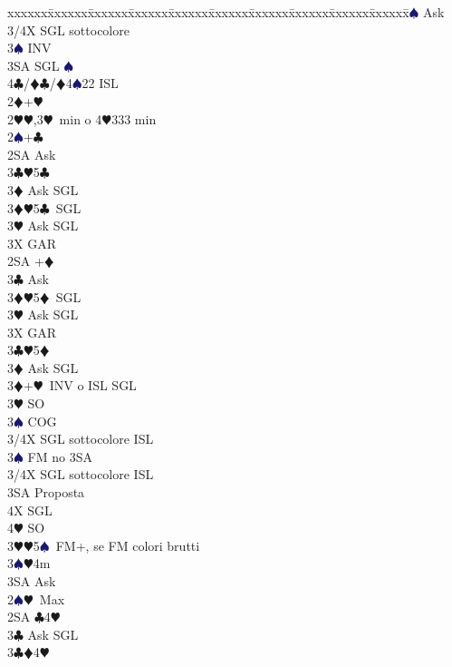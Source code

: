 \documentclass[a4paper,italian]{article}
\newcommand{\BC}{\textcolor{OliveGreen}{$\clubsuit$}}
\newcommand{\BD}{\textcolor{RedOrange}{$\vardiamondsuit$}}
\newcommand{\BH}{\textcolor{Red2}{$\varheartsuit${}}}
\newcommand{\BS}{\textcolor{MidnightBlue}{$\spadesuit${}}}
\newenvironment{bidtable}
{\begin{tabbing}

    xxxxxx\=xxxxxx\=xxxxxx\=xxxxxx\=xxxxxx\=xxxxxx\=xxxxxx\=xxxxxx\=xxxxxx\=xxxxxx\=\kill}
{\end{tabbing} }%
\begin{document}
\begin{multicols}{2}
\begin{bidtable}
        3\BS \> Ask\+\\
        3/4X \> SGL sottocolore\-\-\\
        3\BS \> INV\\
        3SA \> SGL \BS \\
        4\BC/\BD {}\BC /\BD 4\BS 22 ISL\-\-\\
        2\BD {}+\BH \+\\
        2\BH {}\BH ,3\BH\ min o 4\BH 333 min\+\\
        2\BS {}+\BC \+\\
        2SA \> Ask\+\\
        3\BC {}\BH 5\BC \+\\
        3\BD \> Ask SGL\-\\
        3\BD {}\BH 5\BC\ SGL\+\\
        3\BH \> Ask SGL\-\\
        3X \> GAR\-\-\\
        2SA +\BD \+\\
        3\BC \> Ask\+\\
        3\BD {}\BH 5\BD\ SGL\+\\
        3\BH \> Ask SGL\-\\
        3X \> GAR\-\-\\
        3\BC {}\BH 5\BD \+\\
        3\BD \> Ask SGL\-\\
        3\BD {}+\BH\ INV o ISL SGL\+\\
        3\BH \> SO\+\\
        3\BS \> COG\\
        3/4X \> SGL sottocolore ISL\-\\
        3\BS \> FM no 3SA\+\\
        3/4X \> SGL sottocolore ISL\-\\
        3SA \> Proposta\+\\
        4X \> SGL\\
        4\BH \> SO\-\-\\
        3\BH {}\BH 5\BS\ FM+, se FM colori brutti\\
        3\BS {}\BH 4m\+\\
        3SA \> Ask\-\-\\
        2\BS {}\BH\ Max\+\\
        2SA \BC 4\BH \+\\
        3\BC \> Ask SGL\-\\
        3\BC {}\BD 4\BH \+\\

\end{bidtable}
\end{multicols}
\end{document}
